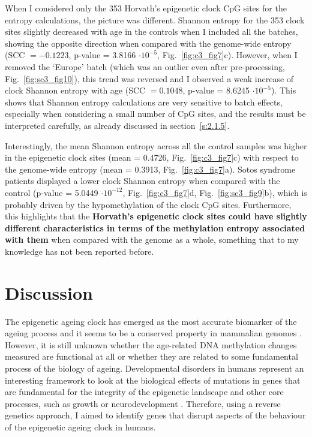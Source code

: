 \bigskip

When I considered only the 353 Horvath's epigenetic clock CpG sites for the entropy calculations, the picture was different. Shannon entropy for the 353 clock sites slightly decreased with age in the controls when I included all the batches, showing the opposite direction when compared with the genome-wide entropy (\acrshort{SCC} $= -0.1223$, p-value = 3.8166 $\cdot 10^{-5}$, Fig.~\ref{fig:c3_fig7}c). However, when I removed the `Europe' batch (which was an outlier even after pre-processing, Fig.~\ref{fig:sc3_fig10}), this trend was reversed and I observed a weak increase of clock Shannon entropy with age (\acrshort{SCC} $= 0.1048$, p-value = 8.6245 $\cdot 10^{-5}$). This shows that Shannon entropy calculations are very sensitive to batch effects, especially when considering a small number of CpG sites, and the results must be interpreted carefully, as already discussed in section~\ref{s:2.1.5}.

\bigskip

Interestingly, the mean Shannon entropy across all the control samples was higher in the epigenetic clock sites (mean = 0.4726, Fig.~\ref{fig:c3_fig7}c) with respect to the genome-wide entropy (mean = 0.3913, Fig.~\ref{fig:c3_fig7}a). Sotos syndrome patients displayed a lower clock Shannon entropy when compared with the control (p-value = 5.0449 $\cdot 10^{-12}$, Fig.~\ref{fig:c3_fig7}d, Fig.~\ref{fig:sc3_fig9}b), which is probably driven by the hypomethylation of the clock CpG sites. Furthermore, this highlights that the \textbf{Horvath's epigenetic clock sites could have slightly different characteristics in terms of the methylation entropy associated with them} when compared with the genome as a whole, something that to my knowledge has not been reported before.

\smallskip

\section{Discussion}

\smallskip

The epigenetic ageing clock has emerged as the most accurate biomarker of the ageing process and it seems to be a conserved property in mammalian genomes \cite{Horvath2018,Field2018}. However, it is still unknown whether the age-related DNA methylation changes measured are functional at all or whether they are related to some fundamental process of the biology of ageing. Developmental disorders in humans represent an interesting framework to look at the biological effects of mutations in genes that are fundamental for the integrity of the epigenetic landscape and other core processes, such as growth or neurodevelopment \cite{Aref-Eshghi2018,Bjornsson2015}. Therefore, using a reverse genetics approach, I aimed to identify genes that disrupt aspects of the behaviour of the epigenetic ageing clock in humans.

